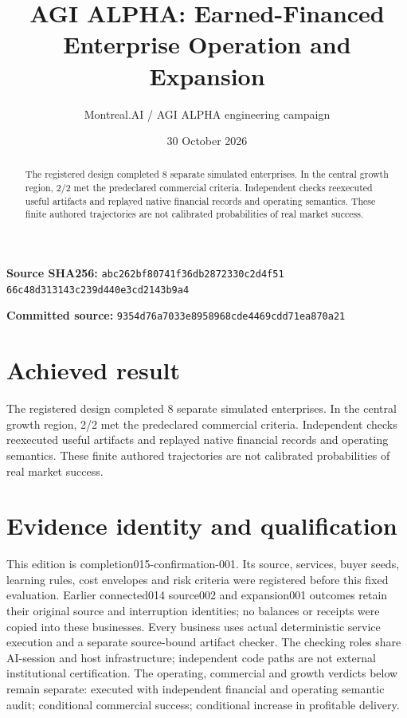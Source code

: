 \documentclass[10pt,letterpaper]{article}
\title{AGI ALPHA: Earned-Financed Enterprise Operation and Expansion}
\author{Montreal.AI / AGI ALPHA engineering campaign}
\date{30 October 2026}
\begin{document}
\maketitle
\begin{center}\end{center}\begin{abstract}The registered design completed 8 separate simulated enterprises. In the central growth region, 2/2 met the predeclared commercial criteria. Independent checks reexecuted useful artifacts and replayed native financial records and operating semantics. These finite authored trajectories are not calibrated probabilities of real market success.\end{abstract}
\textbf{Source SHA256:} \texttt{abc262bf80741f36db2872330c2d4f51}\\\texttt{66c48d313143c239d440e3cd2143b9a4}\par
\textbf{Committed source:} \texttt{9354d76a7033e8958968cde4469cdd71ea870a21}
\section{Achieved result}
The registered design completed 8 separate simulated enterprises. In the central growth region, 2/2 met the predeclared commercial criteria. Independent checks reexecuted useful artifacts and replayed native financial records and operating semantics. These finite authored trajectories are not calibrated probabilities of real market success.
\section{Evidence identity and qualification}
This edition is completion015-confirmation-001. Its source, services, buyer seeds, learning rules, cost envelopes and risk criteria were registered before this fixed evaluation. Earlier connected014 source002 and expansion001 outcomes retain their original source and interruption identities; no balances or receipts were copied into these businesses. Every business uses actual deterministic service execution and a separate source-bound artifact checker. The checking roles share AI-session and host infrastructure; independent code paths are not external institutional certification. The operating, commercial and growth verdicts below remain separate: executed with independent financial and operating semantic audit; conditional commercial success; conditional increase in profitable delivery.
\end{document}
